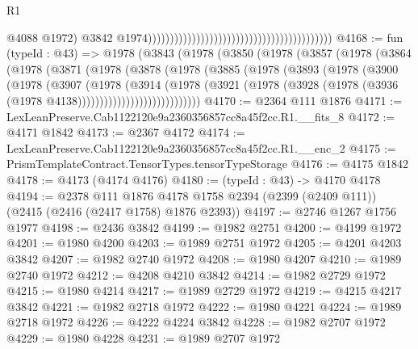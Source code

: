 \begin{lexlean}{R1}
\begin{coremodule}
                                                                                          @4088
                                                                                          @1972)
                                                                                        @3842
                                                                                        @1974))))))))))))))))))))))))))))))))))))))))))
@4168 := fun (typeId : @43) =>
  @1978
    (@3843
      (@1978
        (@3850
          (@1978
            (@3857
              (@1978
                (@3864
                  (@1978
                    (@3871
                      (@1978
                        (@3878
                          (@1978
                            (@3885
                              (@1978
                                (@3893
                                  (@1978
                                    (@3900
                                      (@1978
                                        (@3907
                                          (@1978
                                            (@3914
                                              (@1978
                                                (@3921
                                                  (@1978
                                                    (@3928
                                                      (@1978
                                                        (@3936
                                                          (@1978 @4138))))))))))))))))))))))))))))
@4170 := @2364 @111 @1876
@4171 := LexLeanPreserve.Cab1122120e9a2360356857cc8a45f2cc.R1.__fits_8
@4172 := @4171 @1842
@4173 := @2367 @4172
@4174 := LexLeanPreserve.Cab1122120e9a2360356857cc8a45f2cc.R1.__enc_2
@4175 := PrismTemplateContract.TensorTypes.tensorTypeStorage
@4176 := @4175 @1842
@4178 := @4173 (@4174 @4176)
@4180 := (typeId : @43) -> @4170 @4178
@4194 := @2378
    @111
    @1876
    @4178
    @1758
    @2394
    (@2399 (@2409 @111))
    (@2415 (@2416 (@2417 @1758) @1876 @2393))
@4197 := @2746 @1267 @1756 @1977
@4198 := @2436 @3842
@4199 := @1982 @2751
@4200 := @4199 @1972
@4201 := @1980 @4200
@4203 := @1989 @2751 @1972
@4205 := @4201 @4203 @3842
@4207 := @1982 @2740 @1972
@4208 := @1980 @4207
@4210 := @1989 @2740 @1972
@4212 := @4208 @4210 @3842
@4214 := @1982 @2729 @1972
@4215 := @1980 @4214
@4217 := @1989 @2729 @1972
@4219 := @4215 @4217 @3842
@4221 := @1982 @2718 @1972
@4222 := @1980 @4221
@4224 := @1989 @2718 @1972
@4226 := @4222 @4224 @3842
@4228 := @1982 @2707 @1972
@4229 := @1980 @4228
@4231 := @1989 @2707 @1972

\end{coremodule}
\end{lexlean}
